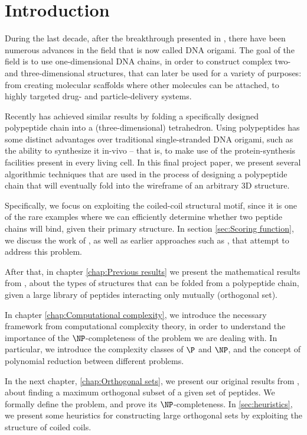 \documentclass[12pt,a4paper,titlepage,openany]{report}
\begin{document}
\chapter{Introduction}
\thispagestyle{fancy}

During the last decade, after the breakthrough presented in \cite{rothemund2006folding}, there have been numerous advances in the field that is now called DNA origami. The goal of the field is to use one-dimensional DNA chains, in order to construct complex two- and three-dimensional structures, that can later be used for a variety of purposes: from creating molecular scaffolds where other molecules can be attached, to highly targeted drug- and particle-delivery systems.

Recently \cite{gradivsar2013design} has achieved similar results by folding a specifically designed polypeptide chain into a (three-dimensional) tetrahedron. Using polypeptides has some distinct advantages over traditional single-stranded DNA origami, such as the ability to synthesize it in-vivo -- that is, to make use of the protein-synthesis facilities present in every living cell. In this final project paper, we present several algorithmic techniques that are used in the process of designing a polypeptide chain that will eventually fold into the wireframe of an arbitrary 3D structure. 

Specifically, we focus on exploiting the coiled-coil structural motif, since it is one of the rare examples where we can efficiently determine whether two peptide chains will bind, given their primary structure. In section \ref{sec:Scoring function}, we discuss the work of \cite{potapov2015data}, as well as earlier approaches such as \cite{fong2004predicting}, that attempt to address this problem. 

After that, in chapter \ref{chap:Previous results} we present the mathematical results from \cite{gradivsar2013design}, about the types of structures that can be folded from a polypeptide chain, given a large library of peptides interacting only mutually (orthogonal set).

In chapter \ref{chap:Computational complexity}, we introduce the necessary framework from computational complexity theory, in order to understand the importance of the $\NP$-completeness of the problem we are dealing with. In particular, we introduce the complexity classes of $\P$ and $\NP$, and the concept of polynomial reduction between different problems.

In the next chapter, \ref{chap:Orthogonal sets}, we present our original results from \cite{brodnik2016construction}, about finding a maximum orthogonal subset of a given set of peptides. We formally define the problem, and prove its $\NP$-completeness.
In \ref{sec:heuristics}, we present some heuristics for constructing large orthogonal sets by exploiting the structure of coiled coils.
\end{document}
